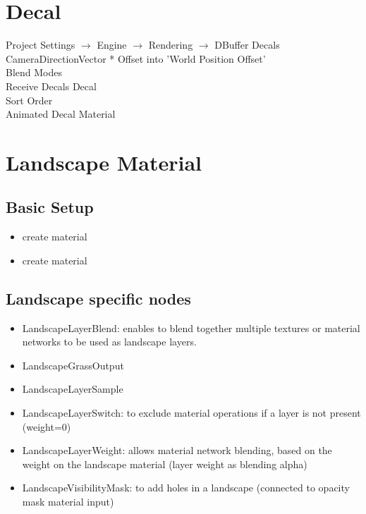     \section{Decal}
        Project Settings $\rightarrow$ Engine $\rightarrow$ Rendering $\rightarrow$ DBuffer Decals \\
        CameraDirectionVector * Offset into 'World Position Offset' \\
        Blend Modes \\
        Receive Decals Decal \\
        Sort Order \\
        Animated Decal Material \\

    \section{Landscape Material}
        \subsection{Basic Setup}
            \begin{itemize}
                \item create material
                \item create material
            \end{itemize}
        \subsection{Landscape specific nodes}
            \begin{itemize}
                \item LandscapeLayerBlend: enables to blend together multiple textures or material networks to be used as landscape layers.
                \item LandscapeGrassOutput
                \item LandscapeLayerSample
                \item LandscapeLayerSwitch: to exclude material operations if a layer is not present (weight=0)
                \item LandscapeLayerWeight: allows material network blending, based on the weight on the landscape material (layer weight as blending alpha)
                \item LandscapeVisibilityMask: to add holes in a landscape (connected to opacity mask material input)
            \end{itemize}

